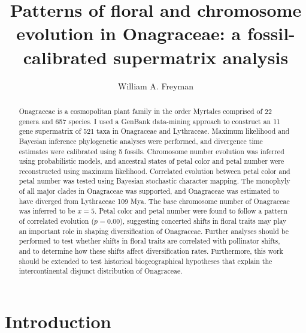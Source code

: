 \documentclass[review]{elsarticle}
\begin{document}
\begin{frontmatter}

\title{Patterns of floral and chromosome evolution in Onagraceae: a fossil-calibrated supermatrix analysis}

\author[berk]{William A. Freyman}

\address[berk]{Jepson Herbarium and Department of Integrative Biology, University of California, Berkeley}

\begin{abstract}
Onagraceae is a cosmopolitan plant family in the order Myrtales comprised of 22 genera and 657 species.
I used a GenBank data-mining approach to construct an 11 gene supermatrix of 521 taxa in Onagraceae and Lythraceae.
Maximum likelihood and Bayesian inference phylogenetic analyses were performed, 
and divergence time estimates were calibrated using 5 fossils.
Chromosome number evolution was inferred using probabilistic models,
and ancestral states of petal color and petal number were reconstructed using maximum likelihood.
Correlated evolution between petal color and petal number was tested using
Bayesian stochastic character mapping.
The monophyly of all major clades in Onagraceae was supported,
and Onagraceae was estimated to have diverged from Lythraceae 109 Mya. 
The base chromosome number of Onagraceae was inferred to be $x=5$.
Petal color and petal number were found
to follow a pattern of correlated evolution ($p=0.00$), 
suggesting concerted shifts in floral traits may play an important role in shaping diversification of Onagraceae. 
Further analyses should be performed to test whether shifts in
floral traits are correlated with pollinator shifts,
and to determine how these shifts affect diversification rates.
Furthermore, this work should be extended to test historical biogeographical hypotheses
that explain the intercontinental disjunct distribution of Onagraceae.
\end{abstract}

\end{frontmatter}




\section{Introduction}
\end{document}
